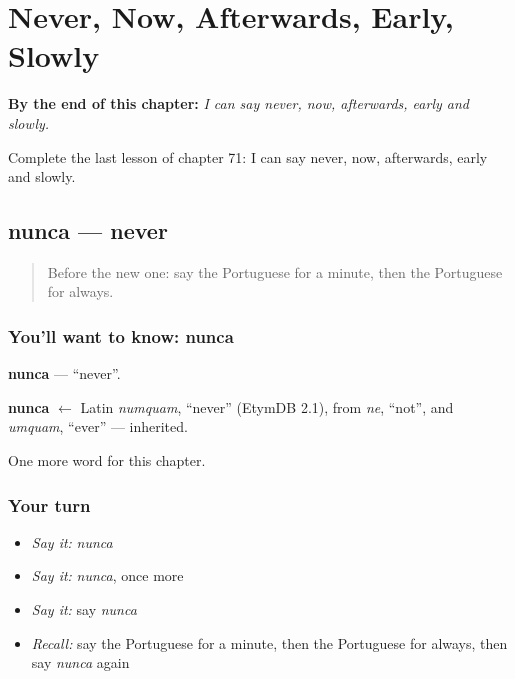 
\chapter{Never, Now, Afterwards, Early, Slowly}
\label{ch:pt-never-now-afterwards-early-slowly}

\begin{chapteropening}
\textbf{By the end of this chapter:} \emph{I can say never, now, afterwards, early and slowly.}

Complete the last lesson of chapter 71: I can say never, now, afterwards, early and slowly.
\end{chapteropening}

\section[nunca]{nunca — never}

\label{lesson:PT-C71-nunca}



\begin{quote}
Before the new one: say the Portuguese for a minute, then the Portuguese for always.
\end{quote}

\subsection*{You'll want to know: nunca}
\textbf{nunca} — \textquotedblleft{}never\textquotedblright{}.

\begin{cousinweb}
\textbf{nunca} $\leftarrow$ Latin \emph{numquam}, \textquotedblleft{}never\textquotedblright{} (EtymDB 2.1), from \emph{ne}, \textquotedblleft{}not\textquotedblright{}, and \emph{umquam}, \textquotedblleft{}ever\textquotedblright{} — inherited.
\end{cousinweb}

\begin{grammarlens}[title={What you've built}]
One more word for this chapter.
\end{grammarlens}

\subsection*{Your turn}
\begin{itemize}
\raggedright
  \item \emph{Say it:} \emph{nunca}
  \item \emph{Say it:} \emph{nunca}, once more
  \item \emph{Say it:} say \emph{nunca}
  \item \emph{Recall:} say the Portuguese for a minute, then the Portuguese for always, then say \emph{nunca} again
\end{itemize}

